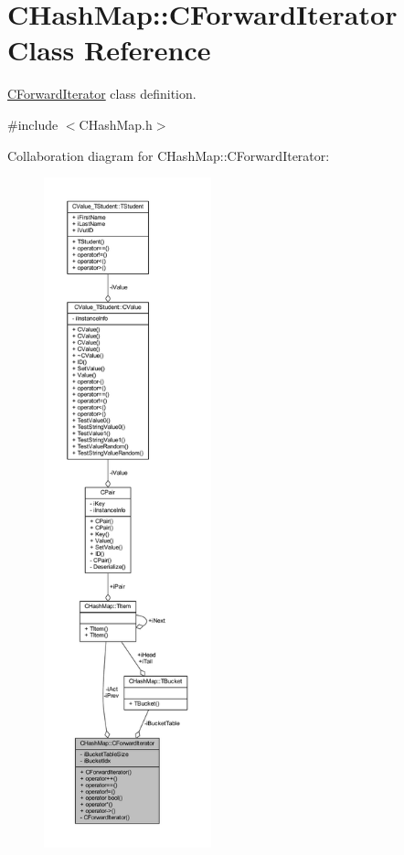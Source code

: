\hypertarget{class_c_hash_map_1_1_c_forward_iterator}{}\section{C\+Hash\+Map\+:\+:C\+Forward\+Iterator Class Reference}
\label{class_c_hash_map_1_1_c_forward_iterator}


\hyperlink{class_c_hash_map_1_1_c_forward_iterator}{C\+Forward\+Iterator} class definition.  




{\ttfamily \#include $<$C\+Hash\+Map.\+h$>$}



Collaboration diagram for C\+Hash\+Map\+:\+:C\+Forward\+Iterator\+:\nopagebreak
\begin{figure}[H]
\begin{center}
\leavevmode
\includegraphics[height=550pt]{class_c_hash_map_1_1_c_forward_iterator__coll__graph}
\end{center}
\end{figure}
